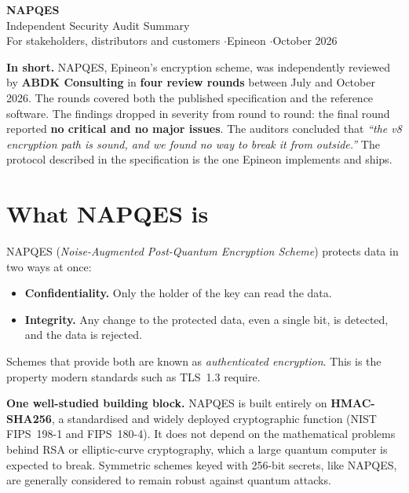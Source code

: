 ﻿\documentclass[11pt,a4paper]{article}
\begin{document}
{\color{brand}\Huge\bfseries NAPQES}\\[0.2em]
{\color{brand}\LARGE Independent Security Audit Summary}\\[0.4em]
{\color{muted}For stakeholders, distributors and customers \quad$\cdot$\quad Epineon \quad$\cdot$\quad October 2026}

\medskip
\noindent\colorbox{panel}{\begin{minipage}{\dimexpr\linewidth-2\fboxsep}
\smallskip
\textbf{\color{brand}In short.} NAPQES, Epineon's encryption scheme, was independently reviewed by
\textbf{ABDK Consulting} in \textbf{four review rounds} between July and October 2026. The rounds
covered both the published specification and the reference software. The findings dropped in
severity from round to round: the final round reported \textbf{no critical and no major issues}.
The auditors concluded that \emph{``the v8 encryption path is sound, and we found no way to break
it from outside.''} The protocol described in the specification is the one Epineon implements
and ships.
\smallskip
\end{minipage}}

\section{What NAPQES is}
NAPQES (\emph{Noise-Augmented Post-Quantum Encryption Scheme}) protects data in two ways at once:
\begin{itemize}
  \item \textbf{Confidentiality.} Only the holder of the key can read the data.
  \item \textbf{Integrity.} Any change to the protected data, even a single bit, is detected,
        and the data is rejected.
\end{itemize}
Schemes that provide both are known as \emph{authenticated encryption}. This is the property
modern standards such as TLS~1.3 require.

\textbf{One well-studied building block.} NAPQES is built entirely on \textbf{HMAC-SHA256}, a
standardised and widely deployed cryptographic function (NIST FIPS~198-1 and FIPS~180-4). It does
not depend on the mathematical problems behind RSA or elliptic-curve cryptography, which a large
quantum computer is expected to break. Symmetric schemes keyed with 256-bit secrets, like NAPQES,
are generally considered to remain robust against quantum attacks.
\end{document}
